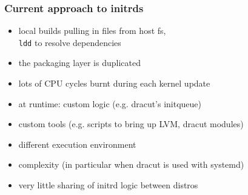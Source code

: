 \documentclass[]{beamer}
\newcommand\pp{}
\begin{document}
\begin{frame}
  \frametitle{Current approach to initrds}




  \pp

  \begin{itemize}
  \item local builds pulling in files from host fs,\\
    \texttt{ldd} to resolve dependencies
  \pp

  \item the packaging layer is duplicated
  \pp

  \item lots of CPU cycles burnt during each kernel update
  \pp

  \quad

  \item at runtime: custom logic (e.g. dracut's initqueue)
  \pp

  \item custom tools (e.g. scripts to bring up LVM, dracut modules)
  \pp

  \item different execution environment
  \pp

  \item complexity (in particular when dracut is used with systemd)
  \pp

  \quad

  \item very little sharing of initrd logic between distros
  \end{itemize}
\end{frame}
\end{document}
